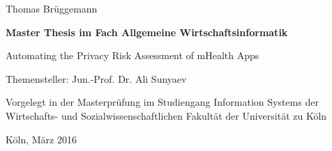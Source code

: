 \vspace*{1mm}

\thispagestyle{empty}
Thomas Brüggemann

\vspace*{23mm}

\begin{center}
\textbf{
    Master Thesis
\linebreak
    im Fach Allgemeine Wirtschaftsinformatik}
\end{center}

\vspace*{20mm}

\begin{center}
\LARGE 
    Automating the Privacy Risk Assessment of mHealth Apps
\end{center}

\vspace*{8mm}

\begin{center}
    Themensteller: Jun.-Prof. Dr. Ali Sunyaev
\end{center}

\vspace*{12mm}

\begin{center}
    Vorgelegt in der Masterprüfung
\linebreak
    im Studiengang Information Systems
\linebreak
    der Wirtschafts- und Sozialwissenschaftlichen Fakultät
\linebreak
    der Universität zu Köln
\end{center}

\vspace*{30mm}

\begin{center}
Köln, März 2016
\end{center}


